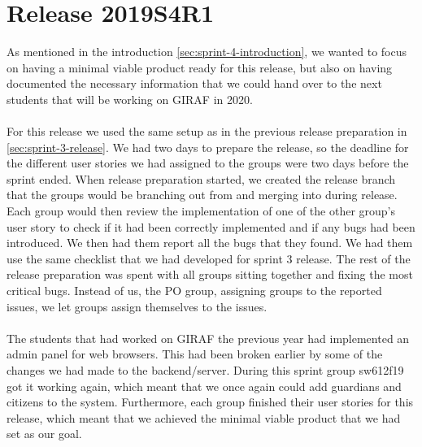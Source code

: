 \section{Release 2019S4R1}
As mentioned in the introduction \autoref{sec:sprint-4-introduction}, we wanted to focus on having a minimal viable product ready for this release, but also on having documented the necessary information that we could hand over to the next students that will be working on GIRAF in 2020.
\\\\
For this release we used the same setup as in the previous release preparation in \autoref{sec:sprint-3-release}. 
We had two days to prepare the release, so the deadline for the different user stories we had assigned to the groups were two days before the sprint ended. When release preparation started, we created the release branch that the groups would be branching out from and merging into during release. Each group would then review the implementation of one of the other group's user story to check if it had been correctly implemented and if any bugs had been introduced. We then had them report all the bugs that they found. We had them use the same checklist that we had developed for sprint 3 release. The rest of the release preparation was spent with all groups sitting together and fixing the most critical bugs. Instead of us, the PO group, assigning groups to the reported issues, we let groups assign themselves to the issues.
\\\\
The students that had worked on GIRAF the previous year had implemented an admin panel for web browsers. This had been broken earlier by some of the changes we had made to the backend/server. During this sprint group sw612f19 got it working again, which meant that we once again could add guardians and citizens to the system. 
Furthermore, each group finished their user stories for this release, which meant that we achieved the minimal viable product that we had set as our goal. 
